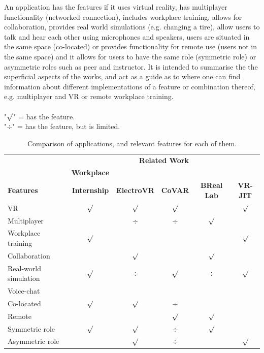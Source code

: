 An application has the features if it uses virtual reality, has multiplayer functionality (networked connection), includes workplace training, allows for collaboration, provides real world simulations (e.g. changing a tire), allow users to talk and hear each other using microphones and speakers, users are situated in the same space (co-located) or provides functionality for remote use (users not in the same space) and it allows for users to have the same role (symmetric role) or asymmetric roles such as peer and instructor.         
It is intended to summarise the the superficial aspects of the works, and act as a guide as to where one can find information about different implementations of a feature or combination thereof, e.g. multiplayer and VR or remote workplace training.  
\\
\newcommand*\ON[0]{$\surd$}
\newcommand*\LIM[0]{$\div$}
\\ "\ON" = has the feature.
\\ "\LIM" = has the feature, but is limited.

\begin{table}[!ht]
    \begin{center}
    \begin{tabular}{@{}l c c c c c @{}}
           & \multicolumn{5}{c}{\textbf{Related Work}}
    \\  \cmidrule{2-6}
           & \textbf{Workplace}
    \\       
             \textbf{Features}
           & \textbf{Internship}
           & \textbf{ElectroVR}
           & \textbf{CoVAR}
           & \textbf{BReal Lab}
           & \textbf{VR-JIT}
    \\ \midrule
       VR                           & \ON & \ON  & \ON  &  & \ON
    \\ Multiplayer                  &     & \LIM & \LIM & \ON &
    \\ Workplace training           & \ON &      &      &  & \ON
    \\ Collaboration                &     & \ON  &      & \ON & 
    \\ Real-world simulation        & \ON & \LIM & \ON  & \LIM & \ON
    \\ Voice-chat                   &     &      &      &  & 
    \\ Co-located                   & \ON & \ON  & \LIM &  &
    \\ Remote                       &     &      & \ON  & \ON &    
    \\ Symmetric role               & \ON & \ON  & \LIM & \ON  &
    \\ Asymmetric role              &     & \ON  & \LIM  & & \ON
    \\ \bottomrule
    \end{tabular}
    \captionsetup{width=1\linewidth}
    \caption{Comparison of applications, and relevant features for each of them.}
    \label{table:comparisonRelatedWork}
    \end{center}
\end{table}







\cleardoublepage